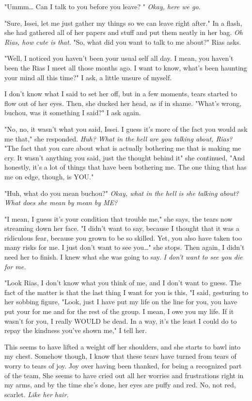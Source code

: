 \documentclass{article}
\begin{document}
"Ummm… Can I talk to you before you leave? " \emph{Okay, here we go.}

"Sure, Issei, let me just gather my things so we can leave right after." In a flash, she had gathered all of her papers and stuff and put them neatly in her bag. \emph{Oh Rias, how cute is that}. "So, what did you want to talk to me about?" Rias asks.

"Well, I noticed you haven't been your usual self all day. I mean, you haven't been the Rias I meet all those months ago. I want to know, what's been haunting your mind all this time?" I ask, a little unsure of myself.

I don't know what I said to set her off, but in a few moments, tears started to flow out of her eyes. Then, she ducked her head, as if in shame. "What's wrong, buchou, was it something I said?" I ask again.

"No, no, it wasn't what you said, Issei. I guess it's more of the fact you would ask me that," she responded. \emph{Huh? What in the hell are you talking about, Rias?} "The fact that you care about what is actually bothering me that is making me cry. It wasn't anything you said, just the thought behind it" she continued, "And honestly, it's a lot of things that have been bothering me. The one thing that has me on edge, though, is YOU."

"Huh, what do you mean buchou?" \emph{Okay, what in the hell is she talking about? What does she mean by mean by ME?}

"I mean, I guess it's your condition that trouble me," she says, the tears now streaming down her face. "I didn't want to say, because I thought that it was a ridiculous fear, because you grown to be so skilled. Yet, you also have taken too many risks for me. I just don't want to see you…" she stops. Then again, I didn't need her to finish. I knew what she was going to say. \emph{I don't want to see you die for me.}

"Look Rias, I don't know what you think of me, and I don't want to guess. The fact of the matter is that the last thing I want for you is this, "I said, gesturing to her sobbing figure, "Look, just I have put my life on the line for you, you have put your for me and for the rest of the group. I mean, I owe you my life. If it wasn't for you, I really WOULD be dead. In a way, it's the least I could do to repay the kindness you've shown me," I tell her.

This seems to have lifted a weight off her shoulders, and she starts to bawl into my chest. Somehow though, I know that these tears have turned from tears of worry to tears of joy. Joy over having been thanked, for being a recognized part of the team, She seems to have cried out all her worries and frustrations right in my arms, and by the time she's done, her eyes are puffy and red. No, not red, scarlet. \emph{Like her hair.}
\end{document}
